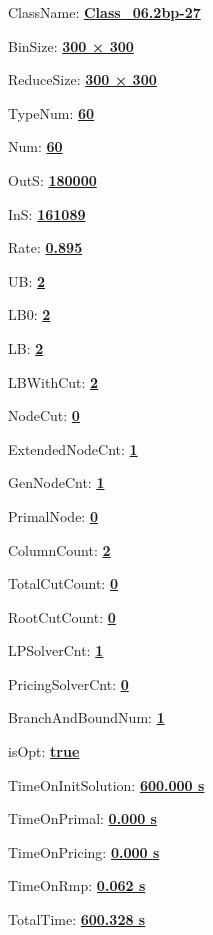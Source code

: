 \documentclass[11pt]{article}
\begin{document}
\pagestyle{empty}


ClassName: \underline{\textbf{Class_06.2bp-27}}
\par
BinSize: \underline{\textbf{300 × 300}}
\par
ReduceSize: \underline{\textbf{300 × 300}}
\par
TypeNum: \underline{\textbf{60}}
\par
Num: \underline{\textbf{60}}
\par
OutS: \underline{\textbf{180000}}
\par
InS: \underline{\textbf{161089}}
\par
Rate: \underline{\textbf{0.895}}
\par
UB: \underline{\textbf{2}}
\par
LB0: \underline{\textbf{2}}
\par
LB: \underline{\textbf{2}}
\par
LBWithCut: \underline{\textbf{2}}
\par
NodeCut: \underline{\textbf{0}}
\par
ExtendedNodeCnt: \underline{\textbf{1}}
\par
GenNodeCnt: \underline{\textbf{1}}
\par
PrimalNode: \underline{\textbf{0}}
\par
ColumnCount: \underline{\textbf{2}}
\par
TotalCutCount: \underline{\textbf{0}}
\par
RootCutCount: \underline{\textbf{0}}
\par
LPSolverCnt: \underline{\textbf{1}}
\par
PricingSolverCnt: \underline{\textbf{0}}
\par
BranchAndBoundNum: \underline{\textbf{1}}
\par
isOpt: \underline{\textbf{true}}
\par
TimeOnInitSolution: \underline{\textbf{600.000 s}}
\par
TimeOnPrimal: \underline{\textbf{0.000 s}}
\par
TimeOnPricing: \underline{\textbf{0.000 s}}
\par
TimeOnRmp: \underline{\textbf{0.062 s}}
\par
TotalTime: \underline{\textbf{600.328 s}}
\par
\newpage
\end{document}
